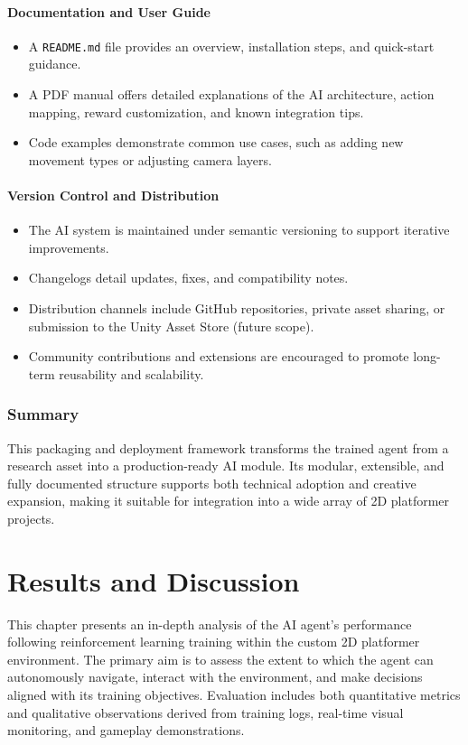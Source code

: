 \documentclass[12pt,oneside,openright,a4paper]{cpe-english-project}
\begin{document}
\subsubsection{Documentation and User Guide}

\begin{itemize}
\item A \texttt{README.md} file provides an overview, installation steps, and quick-start guidance.
\item A PDF manual offers detailed explanations of the AI architecture, action mapping, reward customization, and known integration tips.
\item Code examples demonstrate common use cases, such as adding new movement types or adjusting camera layers.
\end{itemize}

\subsubsection{Version Control and Distribution}

\begin{itemize}
\item The AI system is maintained under semantic versioning to support iterative improvements.
\item Changelogs detail updates, fixes, and compatibility notes.
\item Distribution channels include GitHub repositories, private asset sharing, or submission to the Unity Asset Store (future scope).
\item Community contributions and extensions are encouraged to promote long-term reusability and scalability.
\end{itemize}

\subsection{Summary}
This packaging and deployment framework transforms the trained agent from a research asset into a production-ready AI module. Its modular, extensible, and fully documented structure supports both technical adoption and creative expansion, making it suitable for integration into a wide array of 2D platformer projects.

\chapter{Results and Discussion}
This chapter presents an in-depth analysis of the AI agent’s performance following reinforcement learning training within the custom 2D platformer environment. The primary aim is to assess the extent to which the agent can autonomously navigate, interact with the environment, and make decisions aligned with its training objectives. Evaluation includes both quantitative metrics and qualitative observations derived from training logs, real-time visual monitoring, and gameplay demonstrations.
\end{document}
